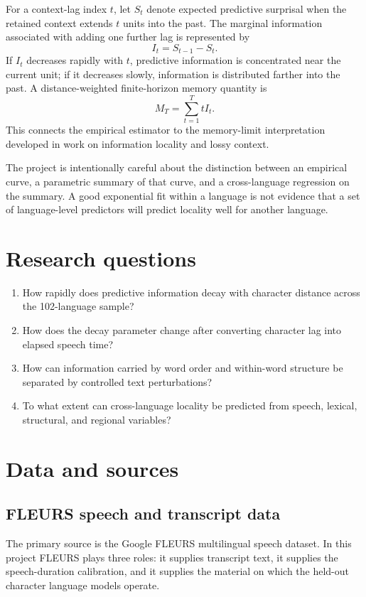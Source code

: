 \documentclass[11pt]{article}
\begin{document}
For a context-lag index $t$, let $S_t$ denote expected predictive surprisal when the retained context extends $t$ units into the past. The marginal information associated with adding one further lag is represented by
\[
I_t = S_{t-1}-S_t.
\]
If $I_t$ decreases rapidly with $t$, predictive information is concentrated near the current unit; if it decreases slowly, information is distributed farther into the past. A distance-weighted finite-horizon memory quantity is
\[
M_T = \sum_{t=1}^{T} t I_t.
\]
This connects the empirical estimator to the memory-limit interpretation developed in work on information locality and lossy context.

The project is intentionally careful about the distinction between an empirical curve, a parametric summary of that curve, and a cross-language regression on the summary. A good exponential fit within a language is not evidence that a set of language-level predictors will predict locality well for another language.

\section{Research questions}
\begin{enumerate}
\item How rapidly does predictive information decay with character distance across the 102-language sample?
\item How does the decay parameter change after converting character lag into elapsed speech time?
\item How can information carried by word order and within-word structure be separated by controlled text perturbations?
\item To what extent can cross-language locality be predicted from speech, lexical, structural, and regional variables?
\end{enumerate}

\section{Data and sources}
\subsection{FLEURS speech and transcript data}
The primary source is the Google FLEURS multilingual speech dataset. In this project FLEURS plays three roles: it supplies transcript text, it supplies the speech-duration calibration, and it supplies the material on which the held-out character language models operate.
\end{document}
